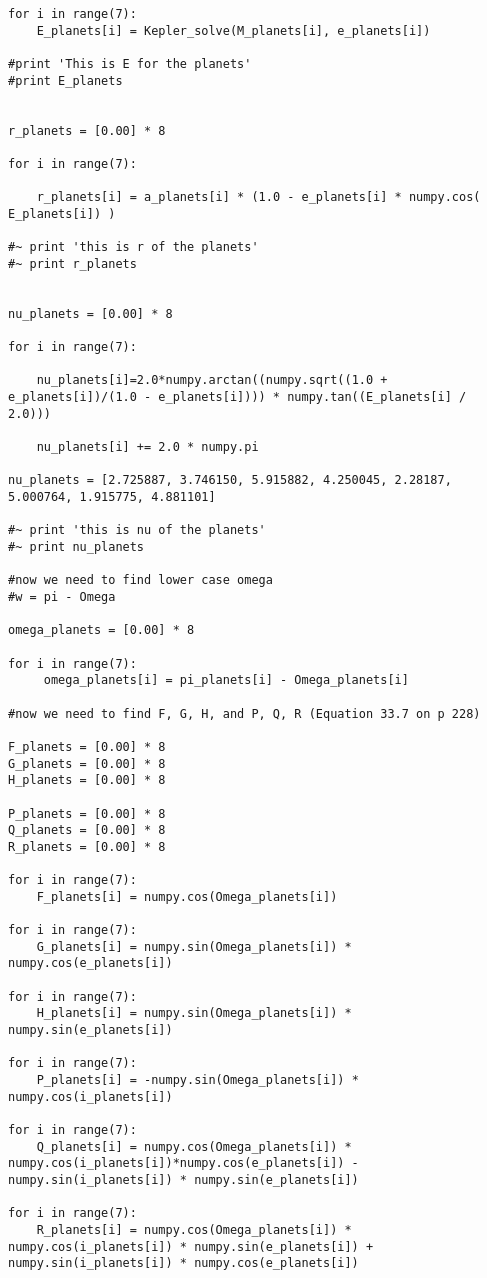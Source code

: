 \documentclass[12pt, leqno]{article}
\begin{document}
\begin{lstlisting}
for i in range(7): 
	E_planets[i] = Kepler_solve(M_planets[i], e_planets[i]) 

#print 'This is E for the planets'
#print E_planets 


r_planets = [0.00] * 8 

for i in range(7): 
	
	r_planets[i] = a_planets[i] * (1.0 - e_planets[i] * numpy.cos( E_planets[i]) )
	
#~ print 'this is r of the planets' 
#~ print r_planets		
	

nu_planets = [0.00] * 8

for i in range(7): 
    
	nu_planets[i]=2.0*numpy.arctan((numpy.sqrt((1.0 + e_planets[i])/(1.0 - e_planets[i]))) * numpy.tan((E_planets[i] / 2.0))) 
	
	nu_planets[i] += 2.0 * numpy.pi 
	
nu_planets = [2.725887, 3.746150, 5.915882, 4.250045, 2.28187, 5.000764, 1.915775, 4.881101]	

#~ print 'this is nu of the planets'
#~ print nu_planets

#now we need to find lower case omega 
#w = pi - Omega 

omega_planets = [0.00] * 8 
 
for i in range(7): 
	 omega_planets[i] = pi_planets[i] - Omega_planets[i]
	 
#now we need to find F, G, H, and P, Q, R (Equation 33.7 on p 228) 

F_planets = [0.00] * 8 
G_planets = [0.00] * 8 
H_planets = [0.00] * 8 

P_planets = [0.00] * 8 
Q_planets = [0.00] * 8 
R_planets = [0.00] * 8 

for i in range(7): 
	F_planets[i] = numpy.cos(Omega_planets[i])
	
for i in range(7): 
	G_planets[i] = numpy.sin(Omega_planets[i]) * numpy.cos(e_planets[i])
	
for i in range(7):
	H_planets[i] = numpy.sin(Omega_planets[i]) * numpy.sin(e_planets[i])
	
for i in range(7): 
	P_planets[i] = -numpy.sin(Omega_planets[i]) * numpy.cos(i_planets[i]) 
	
for i in range(7): 
	Q_planets[i] = numpy.cos(Omega_planets[i]) * numpy.cos(i_planets[i])*numpy.cos(e_planets[i]) - numpy.sin(i_planets[i]) * numpy.sin(e_planets[i]) 
	
for i in range(7): 
	R_planets[i] = numpy.cos(Omega_planets[i]) * numpy.cos(i_planets[i]) * numpy.sin(e_planets[i]) + numpy.sin(i_planets[i]) * numpy.cos(e_planets[i]) 
	


\end{lstlisting}
\end{document}
